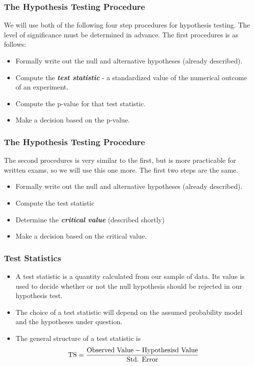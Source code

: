 ﻿\documentclass[a4]{beamer}
\begin{document}
\begin{frame}
\frametitle{The Hypothesis Testing Procedure }
We will use both of the following four step procedures for hypothesis testing. The level of significance must be determined in advance. The first procedures is as follows:

\begin{itemize}
\item Formally write out the null and alternative hypotheses (already described).
\item Compute the \emph{\textbf{test statistic}} - a standardized value of the numerical outcome of an experiment.
\item Compute the p-value for that test statistic.
\item Make a decision based on the p-value.
\end{itemize}
\end{frame}


\begin{frame}
\frametitle{The Hypothesis Testing Procedure }
The second procedures is very similar to the first, but is more practicable for written exams, so we will use this one more. The first two steps are the same.

\begin{itemize}
\item Formally write out the null and alternative hypotheses (already described).
\item Compute the test statistic
\item Determine the \emph{\textbf{critical value}} (described shortly)
\item Make a decision based on the critical value.
\end{itemize}
\end{frame}
\begin{frame}


\frametitle{Test Statistics}
\begin{itemize}
\item A test statistic is a quantity calculated from our sample of data. Its value is used to decide whether or not the null hypothesis should be rejected in our hypothesis test.
\item The choice of a test statistic will depend on the assumed probability model and the hypotheses under question.
    \item The general structure of a test statistic is
\[ \mbox{TS}  = {\mbox{Observed Value} - \mbox{Hypothesisd Value}  \over \mbox{Std. Error}}\]
\end{itemize}
\end{frame}
\end{document}
